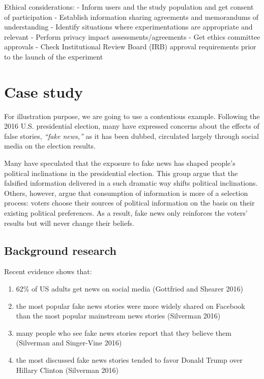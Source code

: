 \documentclass[openany]{book}
\providecommand{\tightlist}{%
  \setlength{\itemsep}{0pt}\setlength{\parskip}{0pt}}
\begin{document}
Ethical considerations:
- Inform users and the study population and get consent of participation
- Establish information sharing agreements and memorandums of understanding
- Identify situations where experimentations are appropriate and relevant
- Perform privacy impact assessments/agreements
- Get ethics committee approvals
- Check Institutional Review Board (IRB) approval requirements prior to the launch of the experiment

\hypertarget{case-study}{%
\chapter{Case study}\label{case-study}}

For illustration purpose, we are going to use a contentious example. Following the 2016 U.S. presidential election, many have expressed concerns about the effects of false stories, \emph{``fake news,''} as it has been dubbed, circulated largely through social media on the election results.

Many have speculated that the exposure to fake news has shaped people's political inclinations in the presidential election. This group argue that the falsified information delivered in a such dramatic way shifts political inclinations. Others, however, argue that consumption of information is more of a selection process: voters choose their sources of political information on the basis on their existing political preferences. As a result, fake news only reinforces the voters' results but will never change their beliefs.

\hypertarget{background-research}{%
\section{Background research}\label{background-research}}

Recent evidence shows that:

\begin{enumerate}
\def\labelenumi{(\arabic{enumi})}
\tightlist
\item
  62\% of US adults get news on social media (Gottfried and Shearer 2016)
\item
  the most popular fake news stories were more widely shared on Facebook than the most popular mainstream news stories (Silverman 2016)
\item
  many people who see fake news stories report that they believe them (Silverman and Singer-Vine 2016)
\item
  the most discussed fake news stories tended to favor Donald Trump over Hillary Clinton (Silverman 2016)
\end{enumerate}
\end{document}
